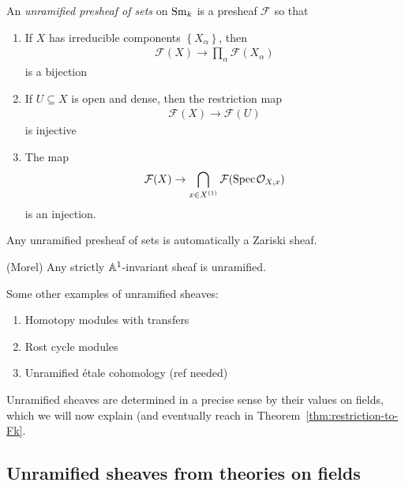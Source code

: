 \documentclass[11pt,openany]{book}
\begin{document}
\begin{definition} \cite[2.1]{Morel} An \textit{unramified presheaf of sets} on $\mathrm{Sm}_k$ is a presheaf $\mathcal{F}$ so that
\begin{enumerate}
    \item If $X$ has irreducible components $\left\{ X_\alpha \right\}$, then
    \begin{align*}
        \mathcal{F}(X) \to \prod_\alpha \mathcal{F}(X_\alpha)
    \end{align*}
    is a bijection
    \item If $U \subseteq X$ is open and dense, then the restriction map
    \begin{align*}
        \mathcal{F}(X) \to \mathcal{F}(U)
    \end{align*}
    is injective
    \item The map
    \begin{align*}
        \mathcal{F}(X) \to\bigcap_{x\in X^{(1)}} \mathcal{F}(\text{Spec}\hspace{0.1em} \mathcal{O}_{X,x})
    \end{align*}
    is an injection.
\end{enumerate}
\end{definition}

\begin{example} Any unramified presheaf of sets is automatically a Zariski sheaf.
\end{example}

\begin{theorem} (Morel) Any strictly $\mathbb{A}^1$-invariant sheaf is unramified.
\end{theorem}

\begin{example} Some other examples of unramified sheaves:
\begin{enumerate}
    \item Homotopy modules with transfers
    \item Rost cycle modules
    \item Unramified \'etale cohomology (ref needed)
\end{enumerate}
\end{example}

Unramified sheaves are determined in a precise sense by their values on fields, which we will now explain (and eventually reach in Theorem~\ref{thm:restriction-to-Fk}.

\subsection{Unramified sheaves from theories on fields}
\end{document}

